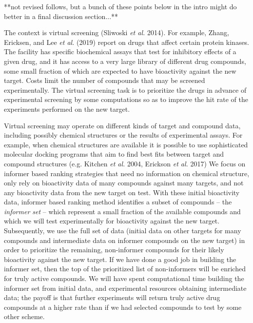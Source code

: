 \documentclass[12pt]{article}
\begin{document}
**not revised follows, but a bunch of these points below in the intro might do better in a final discussion section...**

 The context is virtual screening (Sliwoski {\em et al.} 2014).    For example, Zhang, Ericksen, and Lee {\em et al.} (2019) report on drugs that affect certain protein kinases.
The facility has specific biochemical assays that test for inhibitory effects of a given drug, and it has access to a very large library of different drug compounds, some small fraction of which are expected to have bioactivity against the new target.   
Costs limit the number of compounds that may be screened experimentally.   The virtual screening task is to prioritize the drugs in advance of experimental screening by some computations so as to
improve the hit rate of the experiments performed on the new target.

Virtual screening may operate on different kinds of target and compound data, including possibly chemical structures or the results of experimental assays.   For example, when chemical structures are available it is possible to use sophisticated molecular docking programs that aim to find best fits between target and compound structures (e.g. Kitchen {\em et al.} 2004, Erickson {\em et al.} 2017)
We focus on informer based ranking strategies that need no information on chemical structure, only rely on bioactivity data of many compounds against many targets, and not any bioactivity data from the new target on test.  With these initial bioactivity data,   informer based ranking method
identifies a subset of compounds -- the {\em informer set} -- which
represent a small fraction of the available compounds and which we
will test experimentally for bioactivity against the new target.  Subsequently, we use the full set of data (initial data on other targets
for many compounds and intermediate data on informer compounds on 
the new target) in order to prioritize the remaining, non-informer
compounds for their likely bioactivity against the new target.  If
we have done a good job in building the informer set, then the 
top of the prioritized list of non-informers will be enriched
for truly active compounds.  We will have spent computational time
building the informer set from initial data, and experimental resources
obtaining intermediate data; the payoff is that further experiments
will return truly active drug compounds at  a higher rate than
if we had selected compounds to test by some other scheme.
\end{document}
